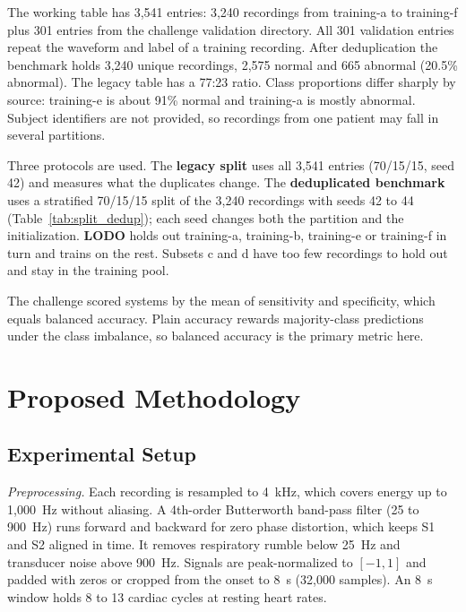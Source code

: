 \documentclass[conference]{IEEEtran}
\begin{document}
The working table has 3,541 entries: 3,240 recordings from training-a to training-f plus 301 entries from the challenge validation directory. All 301 validation entries repeat the waveform and label of a training recording. After deduplication the benchmark holds 3,240 unique recordings, 2,575 normal and 665 abnormal (20.5\% abnormal). The legacy table has a 77:23 ratio. Class proportions differ sharply by source: training-e is about 91\% normal and training-a is mostly abnormal. Subject identifiers are not provided, so recordings from one patient may fall in several partitions.

Three protocols are used. The \textbf{legacy split} uses all 3,541 entries (70/15/15, seed 42) and measures what the duplicates change. The \textbf{deduplicated benchmark} uses a stratified 70/15/15 split of the 3,240 recordings with seeds 42 to 44 (Table~\ref{tab:split_dedup}); each seed changes both the partition and the initialization. \textbf{LODO} holds out training-a, training-b, training-e or training-f in turn and trains on the rest. Subsets c and d have too few recordings to hold out and stay in the training pool.



The challenge scored systems by the mean of sensitivity and specificity, which equals balanced accuracy. Plain accuracy rewards majority-class predictions under the class imbalance, so balanced accuracy is the primary metric here.

\section{Proposed Methodology}

\subsection{Experimental Setup}
\textit{Preprocessing.} Each recording is resampled to 4~kHz, which covers energy up to 1,000~Hz without aliasing. A 4th-order Butterworth band-pass filter (25 to 900~Hz) runs forward and backward for zero phase distortion, which keeps S1 and S2 aligned in time. It removes respiratory rumble below 25~Hz and transducer noise above 900~Hz. Signals are peak-normalized to $[-1,1]$ and padded with zeros or cropped from the onset to 8~s (32,000 samples). An 8~s window holds 8 to 13 cardiac cycles at resting heart rates.
\end{document}

